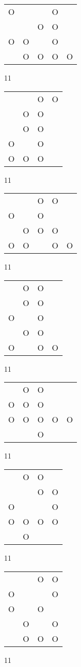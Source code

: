 \begin{tabular}{|m{0.2cm}m{0.2cm}m{0.2cm}m{0.2cm}m{0.2cm}|}\hline
O& & &O& \\
 & &O&O& \\
O&O& &O& \\
 &O&O&O&O\\
\hline\end{tabular}11
\begin{tabular}{|m{0.2cm}m{0.2cm}m{0.2cm}m{0.2cm}|}\hline
 & &O&O\\
 &O&O& \\
 &O&O& \\
O& &O& \\
O&O&O& \\
\hline\end{tabular}11
\begin{tabular}{|m{0.2cm}m{0.2cm}m{0.2cm}m{0.2cm}m{0.2cm}|}\hline
 & &O&O& \\
O& &O& & \\
 &O&O&O& \\
O&O& &O&O\\
\hline\end{tabular}11
\begin{tabular}{|m{0.2cm}m{0.2cm}m{0.2cm}m{0.2cm}|}\hline
 &O&O& \\
 &O&O& \\
O& &O& \\
 &O&O& \\
O& &O&O\\
\hline\end{tabular}11
\begin{tabular}{|m{0.2cm}m{0.2cm}m{0.2cm}m{0.2cm}m{0.2cm}|}\hline
 &O&O& & \\
O&O&O& & \\
O&O&O&O&O\\
 & &O& & \\
\hline\end{tabular}11
\begin{tabular}{|m{0.2cm}m{0.2cm}m{0.2cm}m{0.2cm}|}\hline
 &O&O& \\
 & &O&O\\
O& & &O\\
O&O&O&O\\
 &O& & \\
\hline\end{tabular}11
\begin{tabular}{|m{0.2cm}m{0.2cm}m{0.2cm}m{0.2cm}|}\hline
 & &O&O\\
O& & &O\\
O& &O& \\
 &O& &O\\
 &O&O&O\\
\hline\end{tabular}11
